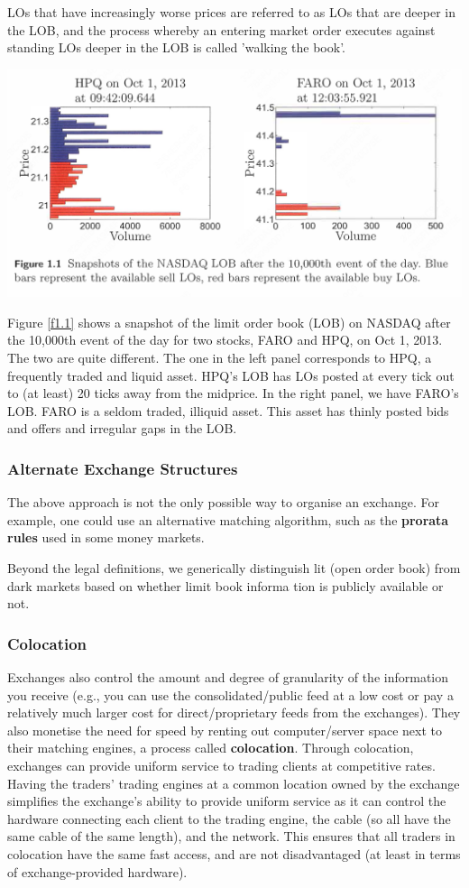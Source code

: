 \documentclass[11pt]{article}
\begin{document}
LOs that have increasingly worse prices are referred to as LOs that are deeper in the LOB, and the
process whereby an entering market order executes against standing LOs deeper in the LOB is called
'walking the book'.

\begin{center}
\includegraphics[width=.8\textwidth]{../images/Misc/15.png}
\label{f1.1}
\end{center}

Figure \ref{f1.1} shows a snapshot of the limit order book (LOB) on NASDAQ after the 10,000th event
of the day for two stocks, FARO and HPQ, on Oct 1, 2013. The two are quite different. The one in
the left panel corresponds to HPQ, a frequently traded and liquid asset. HPQ's LOB has LOs posted
at every tick out to (at least) 20 ticks away from the midprice. In the right panel, we have FARO's
LOB. FARO is a seldom traded, illiquid asset. This asset has thinly posted bids and offers and
irregular gaps in the LOB.
\subsubsection{Alternate Exchange Structures}
\label{sec:org821d581}
The above approach is not the only possible way to organise an exchange. For example, one could use an
alternative matching algorithm, such as the \textbf{prorata rules} used in some money markets.

Beyond the legal definitions, we generically distinguish lit (open order book) from dark markets based
on whether limit book informa­ tion is publicly available or not.
\subsubsection{Colocation}
\label{sec:orgb22897e}
Exchanges also control the amount and degree of granularity of the information you receive (e.g., you
can use the consolidated/public feed at a low cost or pay a relatively much larger cost for
direct/proprietary feeds from the exchanges). They also monetise the need for speed by renting out
computer/server space next to their matching engines, a process called \textbf{colocation}. Through colocation,
exchanges can provide uniform service to trading clients at competitive rates. Having the traders'
trading engines at a common location owned by the exchange simplifies the exchange's ability to
provide uniform service as it can control the hardware connecting each client to the trading engine,
the cable (so all have the same cable of the same length), and the network. This ensures that all
traders in colocation have the same fast access, and are not disadvantaged (at least in terms of
exchange-provided hardware).
\end{document}
